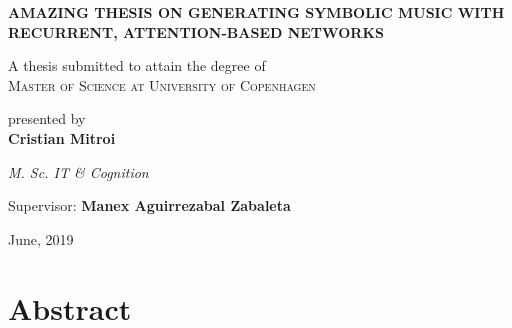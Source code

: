\documentclass[a4paper,]{report}
\begin{document}
\begin{titlepage}
    \begin{center}
    
        \vspace*{2.5cm}
        
       \large{ \textbf{ \uppercase{Amazing Thesis on Generating Symbolic Music with Recurrent,
Attention-Based Networks}}}
        
        \vspace{0.5cm}
        
        \vspace{1.5cm}
 
        A thesis submitted to attain the degree of\\
        \large{\textsc{Master of Science at University of Copenhagen}}
        
        \vspace{0.8cm}        
         
        presented by\\        
        \textbf{Cristian Mitroi}
       
       \vspace{0.8cm}    
        \textit{M. Sc. IT \& Cognition}       
       
       \vspace{0.8cm}          
        Supervisor: \textbf{Manex Aguirrezabal Zabaleta}
             
        \vspace{1cm}
  
        June, 2019
        
     \end{center}
    \thispagestyle{empty}
\end{titlepage} 

\newpage

{
\setcounter{tocdepth}{2}
\tableofcontents
}

\chapter*{Abstract}\label{sec:abstract}
\end{document}
